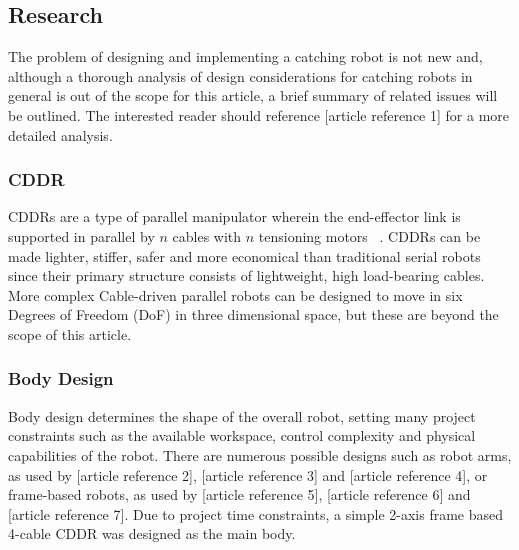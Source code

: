 \documentclass[conference]{IEEEtran}
\begin{document}
\subsection{Research}
The problem of designing and implementing a catching robot is not new and, although a thorough analysis of design considerations for catching robots in general is out of the scope for this article, a brief summary of related issues will be outlined. The interested reader should reference [article reference 1] for a more detailed analysis.
\subsubsection{CDDR}
CDDRs are a type of parallel manipulator wherein the end-effector link is supported in parallel by $n$ cables with $n$ tensioning motors ~\cite{CDDR:description}. CDDRs can be made lighter, stiffer, safer and more economical than traditional serial robots~\cite{WilliamsII2003} since their primary structure consists of lightweight, high load-bearing cables. More complex Cable-driven parallel robots can be designed to move in six Degrees of Freedom (DoF) in three dimensional space, but these are beyond the scope of this article. 

\subsubsection{Body Design}
Body design determines the shape of the overall robot, setting many project constraints such as the available workspace, control complexity and physical capabilities of the robot. There are numerous possible designs such as robot arms, as used by [article reference 2], [article reference 3] and [article reference 4], or frame-based robots, as used by [article reference 5], [article reference 6] and [article reference 7]. Due to project time constraints, a simple 2-axis frame based 4-cable CDDR was designed as the main body.
\end{document}
